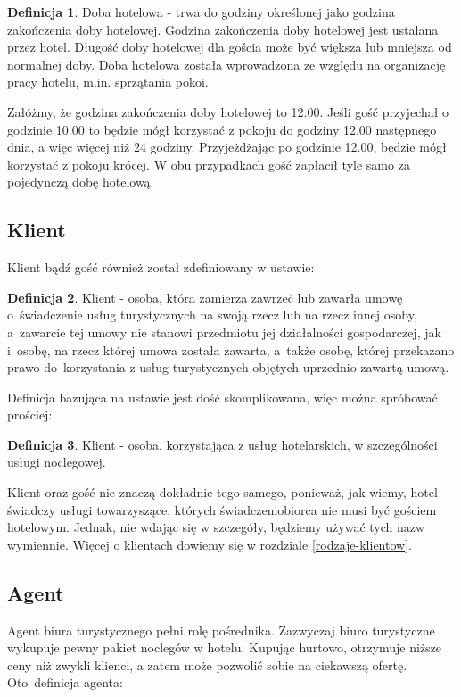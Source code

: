 \documentclass[a4paper,onecolumn,oneside,11pt,wide,floatssmall]{mwrep}
\theoremstyle{definition}
\newtheorem{defn}{Definicja}[section]
\theoremstyle{plain}%
\theoremstyle{remark}
\begin{document}
\begin{defn}{Doba hotelowa} - trwa do godziny określonej jako godzina 
zakończenia doby 
hotelowej. Godzina zakończenia doby hotelowej jest ustalana przez hotel.
 Długość doby hotelowej dla gościa może być większa lub mniejsza 
od normalnej doby. Doba hotelowa została wprowadzona ze względu na 
organizację pracy hotelu, m.in. sprzątania pokoi.

\end{defn}

Załóżmy, że godzina zakończenia doby hotelowej to 12.00. Jeśli gość 
przyjechał o godzinie 10.00 to będzie mógł korzystać z pokoju do godziny 12.00 
następnego dnia, a więc więcej niż 24 godziny. Przyjeżdżając po godzinie 12.00, 
będzie mógł korzystać z pokoju krócej. W obu przypadkach gość zapłacił tyle 
samo za pojedynczą dobę hotelową.


\subsection{Klient}

Klient bądź gość również został zdefiniowany w ustawie\cite{ust:tur}:

\begin{defn}{Klient}
- osoba, która zamierza zawrzeć lub zawarła umowę \mbox{o świadczenie} usług 
turystycznych na swoją rzecz lub na rzecz innej osoby, \mbox{a zawarcie} tej umowy 
nie stanowi przedmiotu jej działalności gospodarczej, jak \mbox{i osobę}, na rzecz 
której umowa została zawarta, \mbox{a także} osobę, której przekazano prawo \mbox{do 
korzystania} z usług turystycznych objętych uprzednio zawartą umową.

\end{defn}

Definicja bazująca na ustawie jest dość skomplikowana, więc można spróbować 
prościej:

\begin{defn}{Klient}
- osoba, korzystająca z usług hotelarskich, w szczególności usługi noclegowej.

\end{defn}

Klient oraz gość nie znaczą dokładnie tego samego, ponieważ, jak wiemy, 
hotel świadczy usługi towarzyszące, których świadczeniobiorca nie musi być 
gościem hotelowym. Jednak, nie wdając się w szczegóły, 
będziemy używać tych nazw wymiennie. Więcej o klientach dowiemy się w rozdziale
\ref{rodzaje-klientow}.

\subsection{Agent}
Agent biura turystycznego pełni rolę pośrednika. Zazwyczaj biuro turystyczne 
wykupuje pewny pakiet noclegów w hotelu. Kupując hurtowo, otrzymuje niższe 
ceny niż zwykli klienci, a zatem może pozwolić sobie na ciekawszą ofertę. 
\mbox{Oto definicja} agenta\cite{ust:tur}:
\end{document}
